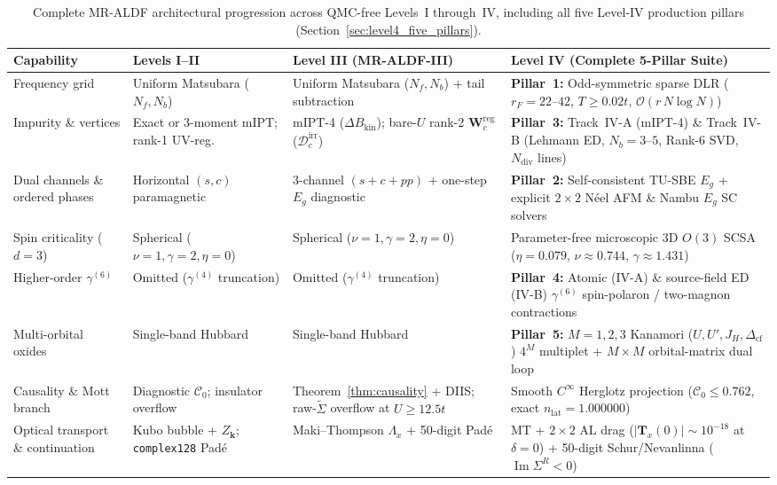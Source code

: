 \documentclass[11pt,a4paper]{article}
\numberwithin{equation}{section}
\theoremstyle{plain}
\theoremstyle{definition}
\providecommand{\vk}{\mathbf{k}}
\providecommand{\im}{\operatorname{Im}}
\begin{document}
\begin{table}[htbp]
\centering
\renewcommand{\arraystretch}{1.16}
\caption{Complete MR-ALDF architectural progression across QMC-free Levels~I through~IV, including all five Level-IV production pillars (Section~\ref{sec:level4_five_pillars}).}
\label{tab:l4_hierarchy}
\vspace{0.4em}
\footnotesize
\begin{tabular}{p{2.7cm}p{3.2cm}p{3.9cm}p{4.8cm}}
\toprule
\textbf{Capability} & \textbf{Levels I--II} & \textbf{Level III (MR-ALDF-III)} & \textbf{Level IV (Complete 5-Pillar Suite)} \\
\midrule
Frequency grid
    & Uniform Matsubara ($N_f, N_b$)
    & Uniform Matsubara ($N_f, N_b$) + tail subtraction
    & \textbf{Pillar~1:} Odd-symmetric sparse DLR ($r_F = 22$--$42$, $T \ge 0.02t$, $\mathcal{O}(r\,N\log N)$) \\
Impurity \& vertices
    & Exact or 3-moment mIPT; rank-1 UV-reg.
    & mIPT-4 ($\Delta B_{\mathrm{kin}}$); bare-$U$ rank-2 $\mathbf{W}_c^{\mathrm{reg}}$ ($\mathcal{D}_c^{\mathrm{irr}}$)
    & \textbf{Pillar~3:} Track~IV-A (mIPT-4) \& Track~IV-B (Lehmann ED, $N_b=3$--$5$, Rank-6 SVD, $N_{\mathrm{div}}$ lines) \\
Dual channels \& ordered phases
    & Horizontal $(s, c)$ paramagnetic
    & 3-channel $(s+c+pp)$ + one-step $E_g$ diagnostic
    & \textbf{Pillar~2:} Self-consistent TU-SBE $E_g$ + explicit $2\times 2$ N\'eel AFM \& Nambu $E_g$ SC solvers \\
Spin criticality ($d = 3$)
    & Spherical ($\nu = 1, \gamma = 2, \eta = 0$)
    & Spherical ($\nu = 1, \gamma = 2, \eta = 0$)
    & Parameter-free microscopic 3D $O(3)$ SCSA ($\eta = 0.079$, $\nu \approx 0.744$, $\gamma \approx 1.431$) \\
Higher-order $\gamma^{(6)}$
    & Omitted ($\gamma^{(4)}$ truncation)
    & Omitted ($\gamma^{(4)}$ truncation)
    & \textbf{Pillar~4:} Atomic (IV-A) \& source-field ED (IV-B) $\gamma^{(6)}$ spin-polaron / two-magnon contractions \\
Multi-orbital oxides
    & Single-band Hubbard
    & Single-band Hubbard
    & \textbf{Pillar~5:} $M=1,2,3$ Kanamori ($U, U', J_H, \Delta_{\mathrm{cf}}$) $4^M$ multiplet + $M\times M$ orbital-matrix dual loop \\
Causality \& Mott branch
    & Diagnostic $\mathcal{C}_0$; insulator overflow
    & Theorem~\ref{thm:causality} + DIIS; raw-$\tilde{\Sigma}$ overflow at $U \ge 12.5t$
    & Smooth $C^\infty$ Herglotz projection ($\mathcal{C}_0 \le 0.762$, exact $n_{\mathrm{lat}} = 1.000000$) \\
Optical transport \& continuation
    & Kubo bubble + $Z_{\vk}$; \texttt{complex128} Pad\'e
    & Maki--Thompson $\Lambda_x$ + 50-digit Pad\'e
    & MT + $2\times 2$ AL drag ($|\mathbf{T}_x(0)| \sim 10^{-18}$ at $\delta=0$) + 50-digit Schur/Nevanlinna ($\im\Sigma^R < 0$) \\
\bottomrule
\end{tabular}
\end{table}
\end{document}
